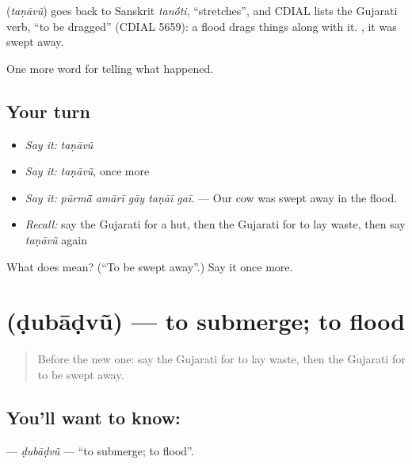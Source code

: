 \begin{cousinweb}
\textbf{} (\emph{taṇāvũ}) goes back to Sanskrit \emph{tan\'{\={o}}ti}, \textquotedblleft{}stretches\textquotedblright{}, and CDIAL lists the Gujarati verb, \textquotedblleft{}to be dragged\textquotedblright{} (CDIAL 5659): a flood drags things along with it. \textbf{ }, it was swept away.
\end{cousinweb}

\begin{grammarlens}[title={What you've built}]
One more word for telling what happened.
\end{grammarlens}

\subsection*{Your turn}
\begin{itemize}
\raggedright
  \item \emph{Say it:} \emph{taṇāvũ}
  \item \emph{Say it:} \emph{taṇāvũ}, once more
  \item \emph{Say it:} \emph{pūrmā̃ amārī gāy taṇāī gaī.} — Our cow was swept away in the flood.
  \item \emph{Recall:} say the Gujarati for a hut, then the Gujarati for to lay waste, then say \emph{taṇāvũ} again
\end{itemize}

\begin{tcolorbox}[breakable,colback=teal!4,colframe=teal!35!black,title={Before you move on}]
What does  mean? (\textquotedblleft{}To be swept away\textquotedblright{}.) Say it once more.
\end{tcolorbox}
\section[\texorpdfstring{\gu{ડુબાડવું} (ḍubāḍvũ)}{ડુબાડવું (ḍubāḍvũ)}]{ (ḍubāḍvũ) — to submerge; to flood}

\label{lesson:GU-C304-dubadvu}



\begin{quote}
Before the new one: say the Gujarati for to lay waste, then the Gujarati for to be swept away.
\end{quote}

\subsection*{You'll want to know: }
\textbf{} — \emph{ḍubāḍvũ} — \textquotedblleft{}to submerge; to flood\textquotedblright{}.

